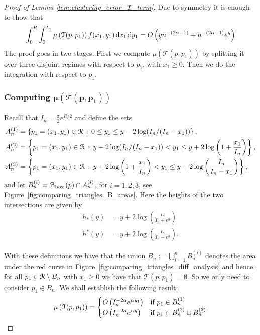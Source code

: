 \begin{proof}[Proof of Lemma \ref{lem:clustering_error_T_term}]
Due to symmetry it is enough to show that
\begin{equation}\label{eq:clustering_error_T_main}
	\int_0^{R}\int_0^{I_n} \mu\left(\mathcal{T}(p,p_1)\right) f(x_1,y_1) 
	\operatorname{\mathrm{d}\hspace{-2pt}} x_1 \operatorname{\mathrm{d}\hspace{-2pt}} y_1 = O\left(y n^{-(2\alpha - 1)} + n^{-(2\alpha-1)} e^{y}\right)
\end{equation}
The proof goes in two stages. First we compute $\mu\left(\mathcal{T}(p,p_1)\right)$ by splitting it over three disjoint regimes with respect to $p_1$, with $x_1 \ge 0$. Then we do the integration with respect to $p_1$.

\subsubsection*{Computing $\bm{\mu\left(\mathcal{T}(p,p_1)\right)}$}

Recall that $I_n = \frac{\pi}{2} e^{R/2}$ and define the sets
\begin{align*}
	A_n^{(1)} &= \left\{p_1 = (x_1,y_1) \in {\mathcal R} \, : \, 0 \le y_1 \le y - 2\log(I_n/(I_n-x_1)) \right\},\\
	A_n^{(2)} &= \left\{p_1 = (x_1,y_1) \in {\mathcal R} \, : \, y - 2\log(I_n/(I_n-x_1)) < y_1 
		\le y + 2 \log\left(1 + \frac{x_1}{I_n}\right)\right\},\\
	A_n^{(3)} &= \left\{p_1 = (x_1,y_1) \in {\mathcal R} \, : \, y + 2 \log\left(1 + \frac{x_1}{I_n}\right) < y_1 
			\le y + 2 \log\left(\frac{I_n}{I_n-x_1}\right)\right\},
\end{align*}
and let $B_n^{(i)} = {\mathcal B}_{\text{box}}\left(p\right) \cap A_n^{(i)}$, for $i = 1, 2, 3$, see Figure~\ref{fig:comparing_triangles_B_areas}. Here the heights of the two intersections are given by
\begin{align}
	h_\ast(y) &= y + 2 \log\left(\frac{I_n}{I_n + e^y}\right)\\
	h^\ast(y) &= y + 2 \log\left(\frac{I_n}{I_n - e^y}\right).
\end{align}

With these definitions we have that the union $B_n := \bigcup_{i = 1}^n B_n^{(i)}$ denotes the area under the red curve in Figure~\ref{fig:comparing_triangles_diff_analysis} and hence, for all $p_1 \in {\mathcal R}\setminus B_n$ with $x_1 \ge 0$ we have that $\mathcal{T}(p,p_1) = \emptyset$. So we only need to consider $p_1 \in B_n$. We shall establish the following result:
\begin{equation}\label{eq:mu_triangle_diff}
	\mu\left(\mathcal{T}(p,p_1)\right) = 
	\begin{cases}
		O\left(I_n^{-2\alpha} e^{\alpha y_1}\right) &\mbox{if } p_1 \in B_n^{(1)}\\
		O\left(I_n^{-2\alpha} e^{\alpha y}\right) &\mbox{if } p_1 \in B_n^{(2)} \cup B_n^{(3)}
	\end{cases}
\end{equation}


\end{proof}
